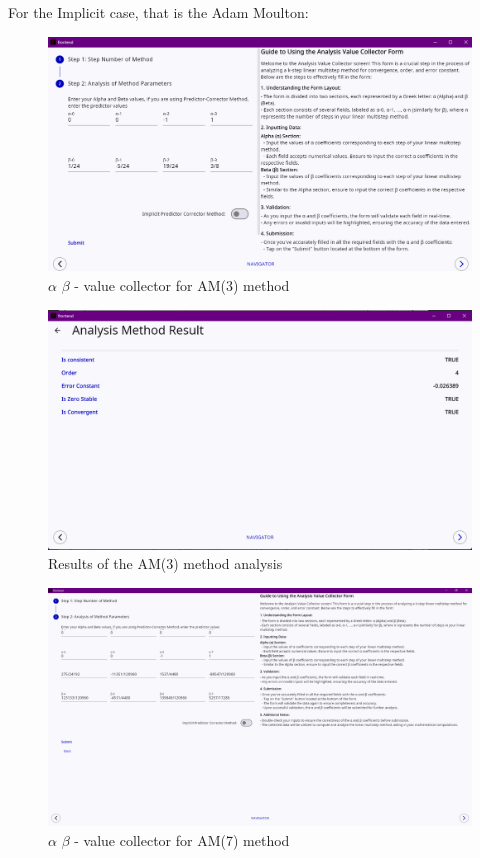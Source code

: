 For the Implicit case, that is the Adam Moulton:

\begin{figure}[htbp]
    \centering
    \includegraphics[width=1\textwidth]{chapters/4/image/am(3)a.png}
    \caption{$\alpha$ $\beta$ - value collector for AM(3) method}
\end{figure}

\begin{figure}[htbp]
    \centering
    \includegraphics[width=1\textwidth]{chapters/4/image/am(3)b.png}
    \caption{Results of the AM(3) method analysis}
\end{figure}

\begin{figure}[htbp]
    \centering
    \includegraphics[width=1\textwidth]{chapters/4/image/am(7)a.png}
    \caption{$\alpha$ $\beta$ - value collector for AM(7) method}
\end{figure}

